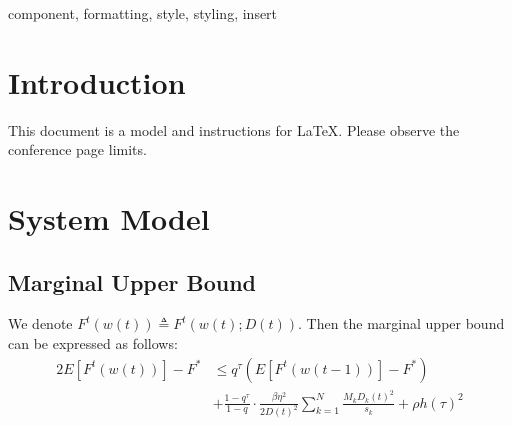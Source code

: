 \documentclass[conference]{IEEEtran}
\begin{document}
\begin{IEEEkeywords}
component, formatting, style, styling, insert
\end{IEEEkeywords}

\section{Introduction}
This document is a model and instructions for \LaTeX.
Please observe the conference page limits. 

\section{System Model}
\subsection{Marginal Upper Bound}
We denote $F^t(w(t)) \triangleq F^t(w(t);D(t))$.
Then the marginal upper bound can be expressed as follows:
\begin{alignat}{2}
    E\left[F^t(w(t))\right] - F^* & \leq q^\tau \left(E\left[F^t(w(t-1))\right] - F^*\right) \\
                      & + \frac{1-q^\tau}{1-q} \cdot \frac{\beta\eta^2}{2{D(t)}^2}\sum_{k=1}^{N}\frac{M_k{D_k(t)}^2}{s_k} + \rho h(\tau)^2
\end{alignat}
\end{document}

